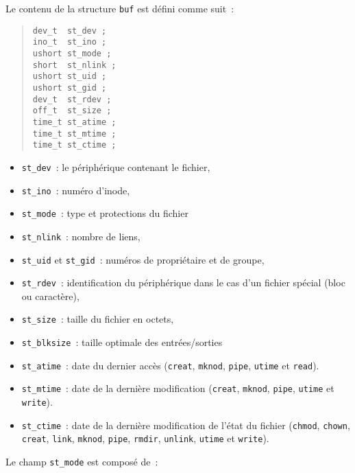 \documentclass [twoside] {report}
\begin{document}
Le contenu de la structure {\tt buf} est défini
comme suit~:

\begin {quote}
\begin {verbatim}
dev_t  st_dev ;
ino_t  st_ino ;
ushort st_mode ;
short  st_nlink ;
ushort st_uid ;
ushort st_gid ;
dev_t  st_rdev ;
off_t  st_size ;
time_t st_atime ;
time_t st_mtime ;
time_t st_ctime ;
\end{verbatim}
\end {quote}

\begin {itemize}
    \item {\tt st\_dev}~: le périphérique contenant le fichier,
    \item {\tt st\_ino}~: numéro d'inode,
    \item {\tt st\_mode}~: type et protections du fichier
    \item {\tt st\_nlink}~: nombre de liens,
    \item {\tt st\_uid} et {\tt st\_gid}~: numéros de propriétaire et de groupe,
    \item {\tt st\_rdev}~: identification du périphérique dans le cas
	d'un fichier spécial (bloc ou caractère),
    \item {\tt st\_size}~: taille du fichier en octets,
    \item {\tt st\_blksize}~: taille optimale des entrées/sorties
    \item {\tt st\_atime}~: date du dernier accès ({\tt creat},
	{\tt mknod}, {\tt pipe}, {\tt utime} et {\tt read}).
    \item {\tt st\_mtime}~: date de la dernière modification
	({\tt creat}, {\tt mknod}, {\tt pipe}, {\tt utime} et {\tt write}).
    \item {\tt st\_ctime}~: date de la dernière modification
	de l'état du fichier ({\tt chmod}, {\tt chown}, {\tt creat},
	{\tt link}, {\tt mknod}, {\tt pipe}, {\tt rmdir}, {\tt unlink},
	{\tt utime} et {\tt write}).
\end {itemize}

Le champ {\tt st\_mode} est composé de~:
\end{document}
